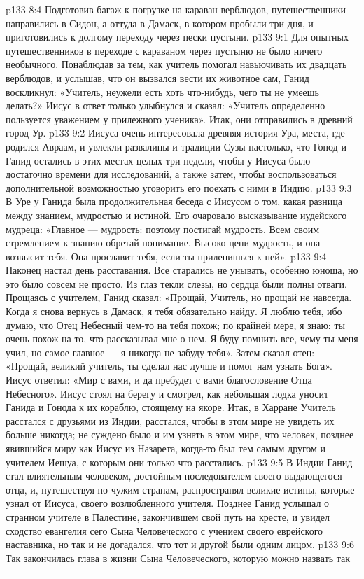 \vs p133 8:4 Подготовив багаж к погрузке на караван верблюдов, путешественники направились в Сидон, а оттуда в Дамаск, в котором пробыли три дня, и приготовились к долгому переходу через пески пустыни.
\vs p133 9:1 Для опытных путешественников в переходе с караваном через пустыню не было ничего необычного. Понаблюдав за тем, как учитель помогал навьючивать их двадцать верблюдов, и услышав, что он вызвался вести их животное сам, Ганид воскликнул: «Учитель, неужели есть хоть что\hyp{}нибудь, чего ты не умеешь делать?» Иисус в ответ только улыбнулся и сказал: «Учитель определенно пользуется уважением у прилежного ученика». Итак, они отправились в древний город Ур.
\vs p133 9:2 Иисуса очень интересовала древняя история Ура, места, где родился Авраам, и увлекли развалины и традиции Сузы настолько, что Гонод и Ганид остались в этих местах целых три недели, чтобы у Иисуса было достаточно времени для исследований, а также затем, чтобы воспользоваться дополнительной возможностью уговорить его поехать с ними в Индию.
\vs p133 9:3 В Уре у Ганида была продолжительная беседа с Иисусом о том, какая разница между знанием, мудростью и истиной. Его очаровало высказывание иудейского мудреца: «Главное --- мудрость: поэтому постигай мудрость. Всем своим стремлением к знанию обретай понимание. Высоко цени мудрость, и она возвысит тебя. Она прославит тебя, если ты прилепишься к ней».
\vs p133 9:4 \pc Наконец настал день расставания. Все старались не унывать, особенно юноша, но это было совсем не просто. Из глаз текли слезы, но сердца были полны отваги. Прощаясь с учителем, Ганид сказал: «Прощай, Учитель, но прощай не навсегда. Когда я снова вернусь в Дамаск, я тебя обязательно найду. Я люблю тебя, ибо думаю, что Отец Небесный чем\hyp{}то на тебя похож; по крайней мере, я знаю: ты очень похож на то, что рассказывал мне о нем. Я буду помнить все, чему ты меня учил, но самое главное --- я никогда не забуду тебя». Затем сказал отец: «Прощай, великий учитель, ты сделал нас лучше и помог нам узнать Бога». Иисус ответил: «Мир с вами, и да пребудет с вами благословение Отца Небесного». Иисус стоял на берегу и смотрел, как небольшая лодка уносит Ганида и Гонода к их кораблю, стоящему на якоре. Итак, в Харране Учитель расстался с друзьями из Индии, расстался, чтобы в этом мире не увидеть их больше никогда; не суждено было и им узнать в этом мире, что человек, позднее явившийся миру как Иисус из Назарета, когда\hyp{}то был тем самым другом и учителем Иешуа, с которым они только что расстались.
\vs p133 9:5 В Индии Ганид стал влиятельным человеком, достойным последователем своего выдающегося отца, и, путешествуя по чужим странам, распространял великие истины, которые узнал от Иисуса, своего возлюбленного учителя. Позднее Ганид услышал о странном учителе в Палестине, закончившем свой путь на кресте, и увидел сходство евангелия сего Сына Человеческого с учением своего еврейского наставника, но так и не догадался, что тот и другой были одним лицом.
\vs p133 9:6 \pc Так закончилась глава в жизни Сына Человеческого, которую можно назвать так --- 
